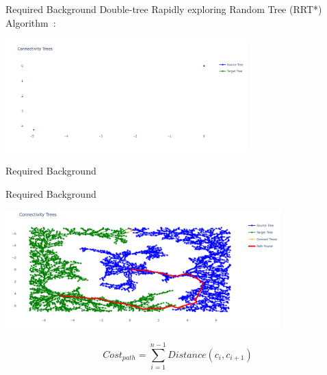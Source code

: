 \begin{frame}[fragile]{Required Background} 
  Double-tree Rapidly exploring Random Tree (RRT*) Algorithm~\cite{chen_fast_2018}:
  \begin{center}
  \includegraphics[width=0.7\textwidth]{figures/required_background/rrt/rrt0}
  \end{center}
\end{frame}

\begin{frame}[fragile]{Required Background} 
\end{frame}

\begin{frame}[fragile]{Required Background}
  \begin{center}
  \includegraphics[width=0.8\textwidth]{figures/required_background/rrt/rrt67}
  \end{center}
\[\mathit{Cost_{path}} = \sum_{i=1}^{n-1} \mathit{Distance}(c_i, c_{i+1})\]
\end{frame}


